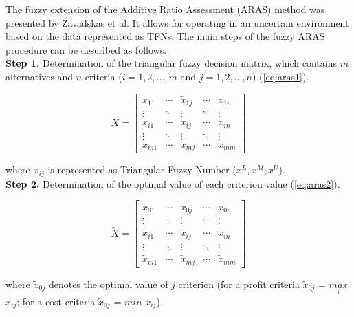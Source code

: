 
The fuzzy extension of the Additive Ratio Assessment (ARAS) method was presented by Zavadskas et al. It allows for operating in an uncertain environment based on the data represented as TFNs. The main steps of the fuzzy ARAS procedure can be described as follows. \\

\noindent \textbf{Step 1.} Determination of the triangular fuzzy decision matrix, which contains $m$ alternatives and $n$ criteria ($i = 1, 2, \ldots, m$ and $j = 1, 2, \ldots, n$) (\ref{eq:aras1}).

\begin{equation}
X=\left[\begin{array}{ccccc}
x_{11} & \cdots & \tilde{x}_{1 j} & \cdots & x_{1 n} \\
\vdots & \ddots & \vdots & \ddots & \vdots \\
x_{i 1} & \cdots & x_{i j} & \cdots & x_{i n} \\
\vdots & \ddots & \vdots & \ddots & \vdots \\
x_{m 1} & \cdots & x_{m j} & \cdots & x_{m m}
\end{array}\right]
\label{eq:aras1}
\end{equation}

\noindent where $x_{ij}$ is represented as Triangular Fuzzy Number ($x^L, x^M, x^U$). \\

\noindent \textbf{Step 2.} Determination of the optimal value of each criterion value (\ref{eq:aras2}).

\begin{equation}
\tilde{X}=\left[\begin{array}{ccccc}
\tilde{x}_{01} & \cdots & \tilde{x}_{0 j} & \cdots & \tilde{x}_{0 n} \\
\vdots & \ddots & \vdots & \ddots & \vdots \\
\tilde{x}_{i 1} & \cdots & \tilde{x}_{i j} & \cdots & \tilde{x}_{i n} \\
\vdots & \ddots & \vdots & \ddots & \vdots \\
\tilde{x}_{m 1} & \cdots & \tilde{x}_{m j} & \cdots & \tilde{x}_{m m}
\end{array}\right]
\label{eq:aras2}
\end{equation}

\noindent where $\tilde{x}_{0j}$ denotes the optimal value of $j$ criterion (for a profit criteria $\tilde{x}_{0j}$ = $\underset{i}{max}$ $x_{ij}$; for a cost criteria $\tilde{x}_{0j}$ = $\underset{i}{min}$ $x_{ij}$). \\

